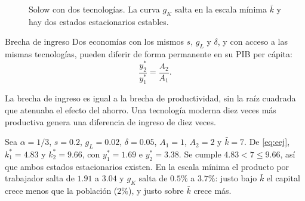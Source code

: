 \documentclass[12pt,letterpaper]{article}
\newcommand{\palfa}{0.3333}  %
\newcommand{\pdel}{0.05}     %
\newcommand{\pgL}{0.02}      %
\newcommand{\ps}{0.2}        %
\newcommand{\pAuno}{1}       %
\newcommand{\pAdos}{2}       %
\newcommand{\pkbar}{7}       %
\begin{document}
\begin{figure}[htb]
\centering
{}
\caption{Solow con dos tecnologías. La curva $g_K$ salta en la escala mínima $\bar k$ y hay dos estados estacionarios estables.}
\label{fig:tec}
\end{figure}

\begin{resultado}{Brecha de ingreso}
Dos economías con los mismos $s$, $g_L$ y $\delta$, y con acceso a las mismas tecnologías, pueden diferir de forma permanente en su PIB per cápita:
\[
  \frac{y_2^*}{y_1^*}=\frac{A_2}{A_1}.
\]
\end{resultado}

\noindent La brecha de ingreso es igual a la brecha de productividad, sin la raíz cuadrada que atenuaba el efecto del ahorro. Una tecnología moderna diez veces más productiva genera una diferencia de ingreso de diez veces.

\begin{intuicion}
Sea $\alpha=1/3$, $s=0.2$, $g_L=0.02$, $\delta=0.05$, $A_1=1$, $A_2=2$ y $\bar k=7$. De \eqref{eq:eej}, $k_1^*=4.83$ y $k_2^*=9.66$, con $y_1^*=1.69$ e $y_2^*=3.38$. Se cumple $4.83<7\leq9.66$, así que ambos estados estacionarios existen. En la escala mínima el producto por trabajador salta de $1.91$ a $3.04$ y $g_K$ salta de $0.5\%$ a $3.7\%$: justo bajo $\bar k$ el capital crece menos que la población ($2\%$), y justo sobre $\bar k$ crece más.
\end{intuicion}
\end{document}
